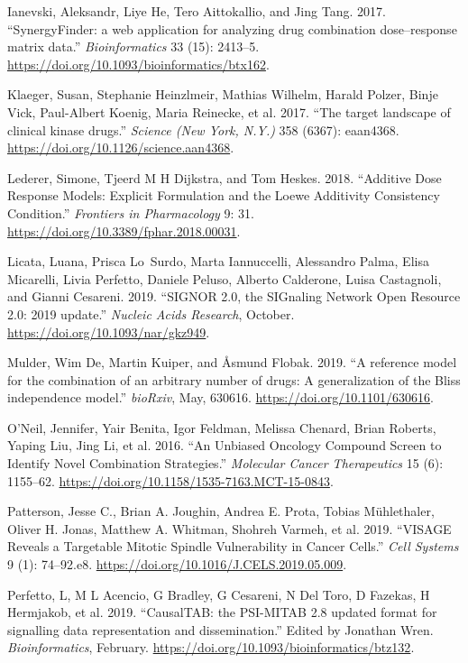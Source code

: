 \documentclass[
  12pt,
]{book}
\newlength{\cslhangindent}
\newenvironment{cslreferences}%
  {\setlength{\parindent}{0pt}%
  \everypar{\setlength{\hangindent}{\cslhangindent}}\ignorespaces}%
  {\par}
\begin{document}
\begin{cslreferences}
\leavevmode\hypertarget{ref-Ianevski2017}{}%
Ianevski, Aleksandr, Liye He, Tero Aittokallio, and Jing Tang. 2017. ``SynergyFinder: a web application for analyzing drug combination dose--response matrix data.'' \emph{Bioinformatics} 33 (15): 2413--5. \url{https://doi.org/10.1093/bioinformatics/btx162}.

\leavevmode\hypertarget{ref-Klaeger2017}{}%
Klaeger, Susan, Stephanie Heinzlmeir, Mathias Wilhelm, Harald Polzer, Binje Vick, Paul-Albert Koenig, Maria Reinecke, et al. 2017. ``The target landscape of clinical kinase drugs.'' \emph{Science (New York, N.Y.)} 358 (6367): eaan4368. \url{https://doi.org/10.1126/science.aan4368}.

\leavevmode\hypertarget{ref-Lederer2018}{}%
Lederer, Simone, Tjeerd M H Dijkstra, and Tom Heskes. 2018. ``Additive Dose Response Models: Explicit Formulation and the Loewe Additivity Consistency Condition.'' \emph{Frontiers in Pharmacology} 9: 31. \url{https://doi.org/10.3389/fphar.2018.00031}.

\leavevmode\hypertarget{ref-Licata2019}{}%
Licata, Luana, Prisca Lo~Surdo, Marta Iannuccelli, Alessandro Palma, Elisa Micarelli, Livia Perfetto, Daniele Peluso, Alberto Calderone, Luisa Castagnoli, and Gianni Cesareni. 2019. ``SIGNOR 2.0, the SIGnaling Network Open Resource 2.0: 2019 update.'' \emph{Nucleic Acids Research}, October. \url{https://doi.org/10.1093/nar/gkz949}.

\leavevmode\hypertarget{ref-Mulder2019}{}%
Mulder, Wim De, Martin Kuiper, and Åsmund Flobak. 2019. ``A reference model for the combination of an arbitrary number of drugs: A generalization of the Bliss independence model.'' \emph{bioRxiv}, May, 630616. \url{https://doi.org/10.1101/630616}.

\leavevmode\hypertarget{ref-ONeil2016}{}%
O'Neil, Jennifer, Yair Benita, Igor Feldman, Melissa Chenard, Brian Roberts, Yaping Liu, Jing Li, et al. 2016. ``An Unbiased Oncology Compound Screen to Identify Novel Combination Strategies.'' \emph{Molecular Cancer Therapeutics} 15 (6): 1155--62. \url{https://doi.org/10.1158/1535-7163.MCT-15-0843}.

\leavevmode\hypertarget{ref-Patterson2019}{}%
Patterson, Jesse C., Brian A. Joughin, Andrea E. Prota, Tobias Mühlethaler, Oliver H. Jonas, Matthew A. Whitman, Shohreh Varmeh, et al. 2019. ``VISAGE Reveals a Targetable Mitotic Spindle Vulnerability in Cancer Cells.'' \emph{Cell Systems} 9 (1): 74--92.e8. \url{https://doi.org/10.1016/J.CELS.2019.05.009}.

\leavevmode\hypertarget{ref-Perfetto2019}{}%
Perfetto, L, M L Acencio, G Bradley, G Cesareni, N Del Toro, D Fazekas, H Hermjakob, et al. 2019. ``CausalTAB: the PSI-MITAB 2.8 updated format for signalling data representation and dissemination.'' Edited by Jonathan Wren. \emph{Bioinformatics}, February. \url{https://doi.org/10.1093/bioinformatics/btz132}.


\end{cslreferences}
\end{document}
